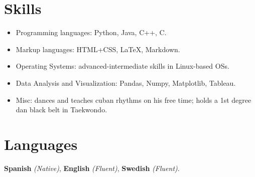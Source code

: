 \documentclass[letterpaper,10pt]{article}
\begin{document}
\section{Skills}
\begin{itemize}[leftmargin=*]
  \item Programming languages: Python, Java, C++, C.
  \vspace{-5pt}\item Markup languages: HTML+CSS, \LaTeX, Markdown.
  \vspace{-5pt}\item Operating Systems: advanced-intermediate skills in Linux-based OSs.
  \vspace{-5pt}\item Data Analysis and Visualization: Pandas, Numpy, Matplotlib, Tableau.
  \vspace{-5pt}\item Misc: dances and teaches cuban rhythms on his free time; holds a 1st degree dan black belt in Taekwondo.
\end{itemize}

\section{Languages}
\textbf{Spanish} \emph{(Native)}, \textbf{English} \emph{(Fluent)}, \textbf{Swedish} \emph{(Fluent)}.



\end{document}
